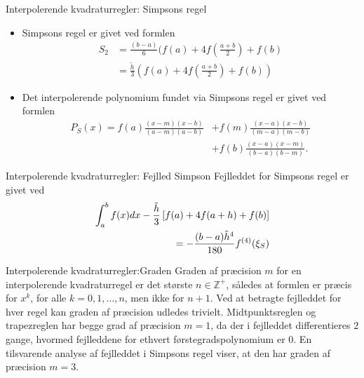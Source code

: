 \begin{frame}{Interpolerende kvadraturregler: Simpsons regel}
    \begin{itemize}
    \item Simpsons regel er givet ved formlen 
    \begin{align*}
    S_2 &= \frac{(b-a)}{6}(f(a)+4f(\frac{a+b}{2})+f(b)\\
    &=\frac{\widetilde{h}}{3}(f(a)+4f(\frac{a+b}{2})+f(b))
    \end{align*}
    \item Det interpolerende polynomium fundet via Simpsons regel er givet ved formlen
    \begin{align*}
    P_{S}(x)=f(a)\frac{(x-m)(x-b)}{(a-m)(a-b)}&+f(m)\frac{(x-a)(x-b)}{(m-a)(m-b)}\\
    &+f(b)\frac{(x-a)(x-m)}{(b-a)(b-m)}.
    \end{align*}
       \end{itemize}
\end{frame}


\begin{frame}{Interpolerende kvadraturregler: Fejlled Simpson}
    Fejlleddet for Simpsons regel er givet ved 
    \begin{align*}
    \int_{a}^{b}f(x)dx-\frac{\Tilde{h}}{3}\left [ f(a)+4f(a+h) + f(b) \right ]\\
    =-\frac{(b-a)\Tilde{h}^4}{180}{f}^{(4)}(\xi_S)
    \end{align*}
    
\end{frame}


\begin{frame}{Interpolerende kvadraturregler:Graden}
    Graden af præcision $m$ for en interpolerende kvadraturregel er det største $n \in \mathbb{Z^+}$, således at formlen er præcis for $x^k$, for alle $k = 0, 1, \ldots , n$, men ikke for $n+1$.
    Ved at betragte fejlleddet for hver regel kan graden af præcision udledes trivielt. 
    Midtpunktsreglen og trapezreglen har begge grad af præcision $m=1$, da der i fejlleddet differentieres $2$ gange, hvormed fejlleddene for ethvert førstegradspolynomium er $0$. 
    En tilsvarende analyse af fejlleddet i Simpsons regel viser, at den har graden af præcision $m=3$.
\end{frame}